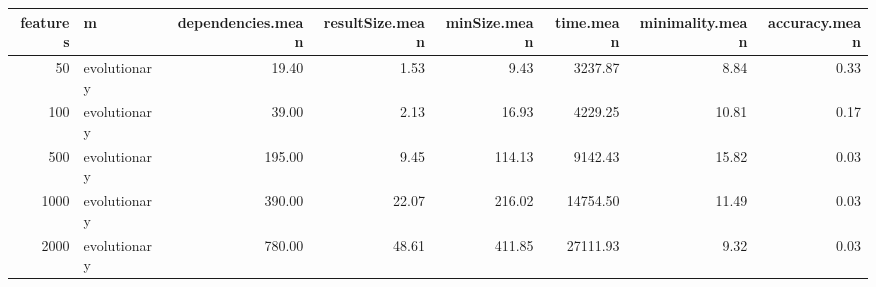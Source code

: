 \begin{table}[ht]
\centering
\begin{tabular}{rlrrrrrr}
  \hline
features & m & dependencies.mean & resultSize.mean & minSize.mean & time.mean & minimality.mean & accuracy.mean \\ 
  \hline
 50 & evolutionary & 19.40 & 1.53 & 9.43 & 3237.87 & 8.84 & 0.33 \\ 
  100 & evolutionary & 39.00 & 2.13 & 16.93 & 4229.25 & 10.81 & 0.17 \\ 
  500 & evolutionary & 195.00 & 9.45 & 114.13 & 9142.43 & 15.82 & 0.03 \\ 
  1000 & evolutionary & 390.00 & 22.07 & 216.02 & 14754.50 & 11.49 & 0.03 \\ 
  2000 & evolutionary & 780.00 & 48.61 & 411.85 & 27111.93 & 9.32 & 0.03 \\ 
   \hline
\end{tabular}
\end{table}
